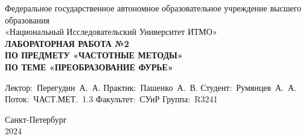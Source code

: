 \documentclass[a4paper, 16pt]{article}
\begin{document}
\begin{titlepage}

    \begin{center}
    \vfill
    
    Федеральное государственное автономное образовательное учреждение высшего образования\\
    «Национальный Исследовательский Университет ИТМО»\ \\
    
    \vfill
    {\large\bf ЛАБОРАТОРНАЯ РАБОТА №2\\
        ПО ПРЕДМЕТУ «ЧАСТОТНЫЕ МЕТОДЫ»\\
        ПО ТЕМЕ «ПРЕОБРАЗОВАНИЕ ФУРЬЕ»}
    \vfill
        
    \begin{flushright}
        \begin{minipage}{.45\textwidth}
        {
            \hbox{Лектор: Перегудин А. А.}
            \hbox{Практик: Пашенко А. В.}
            \hbox{Студент: Румянцев А. А.}
            \hbox{Поток: ЧАСТ.МЕТ. 1.3}
            \hbox{}
            \hbox{Факультет: СУиР}
            \hbox{Группа: R3241}
        }
        \end{minipage}
    \end{flushright}
    
    \vfill
            
    Санкт-Петербург\\
    2024
    \end{center}
    \end{titlepage}
    \setlength{\parskip}{1.5mm}
    
    \tableofcontents
\end{document}
